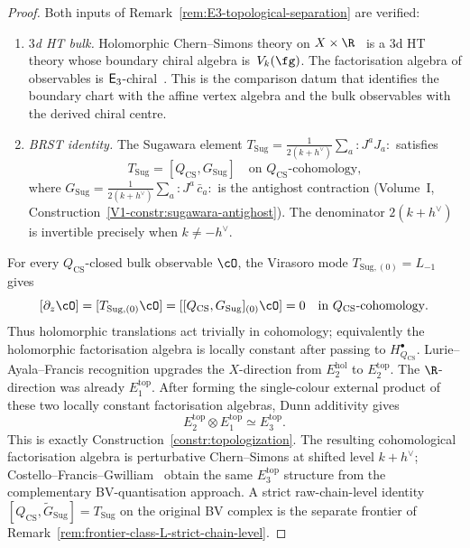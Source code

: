 \begin{proof}
Both inputs of
Remark~\ref{rem:E3-topological-separation} are verified:
\begin{enumerate}[label=\textup{(\alph*)}]
\item \emph{$3$d HT bulk.}
 Holomorphic Chern--Simons theory on
 $X \times \R$~\cite{CL16} is a $3$d HT theory
 whose boundary chiral algebra is~$V_k(\fg)$.
 The factorisation algebra of observables is
 $\mathsf{E}_3$-chiral~\cite{CFG26}.  This is the comparison datum
 that identifies the boundary chart with the affine vertex algebra
 and the bulk observables with the derived chiral centre.
\item \emph{BRST identity.}
 The Sugawara element
 $T_{\mathrm{Sug}} = \frac{1}{2(k+h^\vee)}\sum_a {:}J^a J_a{:}$
 satisfies
 \[
 T_{\mathrm{Sug}}=[Q_{\mathrm{CS}},G_{\mathrm{Sug}}]
 \quad\text{on }Q_{\mathrm{CS}}\text{-cohomology},
 \]
 where
 $G_{\mathrm{Sug}} = \frac{1}{2(k+h^\vee)}\sum_a {:}J^a\,
 \bar c_a{:}$ is the antighost contraction
 \textup{(}Volume~I,
 Construction~\textup{\ref*{V1-constr:sugawara-antighost}}\textup{)}.
 The denominator $2(k + h^\vee)$ is invertible precisely when
 $k \ne -h^\vee$.
\end{enumerate}
For every \(Q_{\mathrm{CS}}\)-closed bulk observable \(\cO\), the
Virasoro mode \(T_{\mathrm{Sug},(0)}=L_{-1}\) gives
\[
[\partial_z\cO]
= [T_{\mathrm{Sug},(0)}\cO]
= [[Q_{\mathrm{CS}},G_{\mathrm{Sug}}]_{(0)}\cO]
=0
\quad\text{in }Q_{\mathrm{CS}}\text{-cohomology}.
\]
Thus holomorphic translations act trivially in cohomology; equivalently
the holomorphic factorisation algebra is locally constant after
passing to \(H^\bullet_{Q_{\mathrm{CS}}}\).  Lurie--Ayala--Francis
recognition upgrades the \(X\)-direction from \(E_2^{\mathrm{hol}}\)
to \(E_2^{\mathrm{top}}\).  The \(\R\)-direction was already
\(E_1^{\mathrm{top}}\).  After forming the single-colour external
product of these two locally constant factorisation algebras,
Dunn additivity gives
\[
E_2^{\mathrm{top}}\otimes E_1^{\mathrm{top}}
\simeq E_3^{\mathrm{top}}.
\]
This is exactly Construction~\ref{constr:topologization}.  The
resulting cohomological factorisation algebra is perturbative
Chern--Simons at shifted level \(k+h^\vee\); Costello--Francis--Gwilliam~\cite{CFG26}
obtain the same \(E_3^{\mathrm{top}}\)
structure from the complementary BV-quantisation approach.  A strict
raw-chain-level identity
\([Q_{\mathrm{CS}},\widetilde G_{\mathrm{Sug}}]=T_{\mathrm{Sug}}\)
on the original BV complex is the separate frontier of
Remark~\ref{rem:frontier-class-L-strict-chain-level}.
\end{proof}

